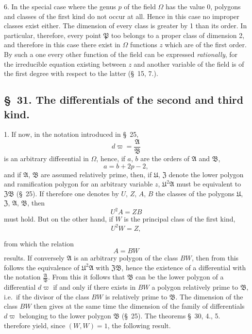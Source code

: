\documentclass{article}
\begin{document}
6. In the special case where the genus $p$ of the field $\Omega$ has the value 0, polygons and classes of the first kind do not occur at all. Hence in this case no improper classes exist either. The dimension of every class is greater by 1 than its order. In particular, therefore, every point $\mathfrak{P}$ too belongs to a proper class of dimension 2, and therefore in this case there exist in $\Omega$ functions $z$ which are of the first order. By such a one every other function of the field can be expressed \emph{rationally}, for the irreducible equation existing between $z$ and another variable of the field is of the first degree with respect to the latter (§~15, 7.).

\subsection*{§~31. The differentials of the second and third kind.}

1. If now, in the notation introduced in §~25,
\[ d\varpi = \frac{\mathfrak{A}}{\mathfrak{B}} \]
is an arbitrary differential in $\Omega$, hence, if $a$, $b$ are the orders of $\mathfrak{A}$ and $\mathfrak{B}$,
\[ a = b+2p-2, \]
and if $\mathfrak{A}$, $\mathfrak{B}$ are assumed relatively prime, then, if $\mathfrak{U}$, $\mathfrak{Z}$ denote the lower polygon and ramification polygon for an arbitrary variable $z$, $\mathfrak{U}^{2}\mathfrak{A}$ must be equivalent to $\mathfrak{Z}\mathfrak{B}$ (§~25). If therefore one denotes by $U$, $Z$, $A$, $B$ the classes of the polygons $\mathfrak{U}$, $\mathfrak{Z}$, $\mathfrak{A}$, $\mathfrak{B}$, then
\[ U^{2}A = ZB \]
must hold. But on the other hand, if $W$ is the principal class of the first kind,
\[ U^{2}W = Z, \]

from which the relation
\[ A = BW \]
results. If conversely $\mathfrak{A}$ is an arbitrary polygon of the class $BW$, then from this follows the equivalence of $\mathfrak{U}^{2}\mathfrak{A}$ with $\mathfrak{Z}\mathfrak{B}$, hence the existence of a differential with the notation $\frac{\mathfrak{A}}{\mathfrak{B}}$. From this it follows that $\mathfrak{B}$ can be the lower polygon of a differential $d\varpi$ if and only if there exists in $BW$ a polygon relatively prime to $\mathfrak{B}$, i.e.\ if the divisor of the class $BW$ is relatively prime to $\mathfrak{B}$. The dimension of the class $BW$ then gives at the same time the dimension of the family of differentials $d\varpi$ belonging to the lower polygon $\mathfrak{B}$ (§~25). The theorems §~30, 4., 5. therefore yield, since $(W, W) = 1$, the following result.
\end{document}
